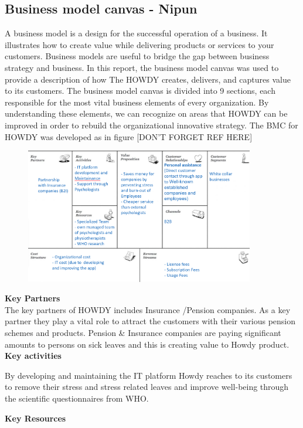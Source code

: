 \subsection{Business model canvas - Nipun}
A business model is a design for the successful operation of a business. It illustrates how to create value while delivering products or services to your customers. Business models are useful to bridge the gap between business strategy and business. In this report, the business model canvas was used to provide a description of how The HOWDY creates, delivers, and captures value to its customers. The business model canvas is divided into 9 sections, each responsible for the most vital business elements of every organization. By understanding these elements, we can recognize on areas that HOWDY can be improved in order to rebuild the organizational innovative strategy. The BMC for HOWDY was developed as in figure [DON'T FORGET REF HERE]\\

\begin{figure}[H]
\includegraphics[width=10cm]{figures/BCDRAFT.png}
\centering
\end{figure}

\noindent \textbf{Key Partners}\\
\noindent The key partners of HOWDY includes Insurance /Pension companies. As a key partner they play a vital role to attract the customers with their various pension schemes and products. Pension \& Insurance companies are paying significant amounts to persons on sick leaves and this is creating value to Howdy product.\\
\noindent \textbf{Key activities}

\noindent By developing and maintaining the IT platform Howdy reaches to its customers to remove their stress and stress related leaves and improve well-being through the scientific questionnaires from WHO.

\noindent \textbf{Key Resources}

